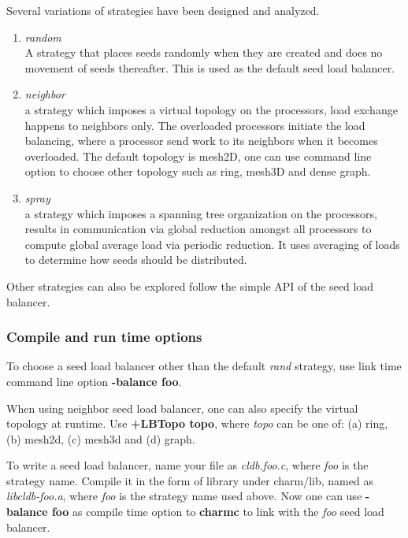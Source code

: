 Several variations of strategies have been designed and analyzed. 
\begin{enumerate}
\item {\em random}\\  
 A strategy that places seeds randomly when they are created and does
no movement of seeds thereafter. This is used as the default seed 
load balancer.
\item {\em neighbor}\\  
 a strategy which imposes a virtual topology on the processors,
 load exchange happens to neighbors only. The overloaded processors
 initiate the load balancing, where a processor send work to its neighbors
 when it becomes overloaded. The default topology is mesh2D, one can use
 command line option to choose other topology such as ring, mesh3D and 
 dense graph.
\item {\em spray}\\  
 a strategy which imposes a spanning tree organization on the processors,
 results in communication via global reduction amongst all processors 
 to compute global average load via periodic reduction. 
 It uses averaging of loads to determine how seeds should be
distributed.
\end{enumerate}

Other strategies can also be explored follow the simple API of the 
seed load balancer.

\subsubsection{Compile and run time options}

To choose a seed load balancer other than the default {\em rand} strategy,
use link time command line option {\bf -balance foo}. 

When using {\rm neighbor} seed load balancer, one can also specify
the virtual topology at runtime. Use {\bf +LBTopo topo}, where {\em topo}
can be one of: (a) ring, (b) mesh2d, (c) mesh3d and (d) graph.

To write a seed load balancer, name your file as {\em cldb.foo.c},
where {\em foo} is the strategy name.  Compile it in the form of library
under charm/lib, named as {\em libcldb-foo.a}, where {\em foo} is the strategy 
name used above. Now one can use {\bf -balance foo} as compile time option
to {\bf charmc} to link with the {\em foo} seed load balancer.

